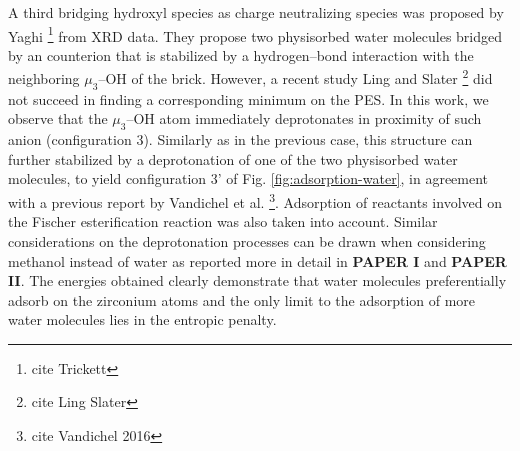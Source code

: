 A third bridging hydroxyl species as charge neutralizing species was proposed by Yaghi \footnote{cite Trickett} from XRD data. They propose two physisorbed water molecules bridged by an  counterion that is stabilized by a hydrogen--bond interaction with the neighboring $\mu_3$--OH of the brick. However, a recent study Ling and Slater \footnote{cite Ling Slater} did not succeed in finding a corresponding minimum on the PES. In this work, we observe that the $\mu_3$--OH atom immediately deprotonates in proximity of such  anion (configuration 3). Similarly as in the previous case, this structure can further stabilized by a deprotonation of one of the two physisorbed water molecules, to yield configuration 3’ of Fig. \ref{fig:adsorption-water}, in agreement with a previous report by Vandichel et al. \footnote{cite Vandichel 2016}. Adsorption of reactants involved on the Fischer esterification reaction was also taken into account. Similar considerations on the deprotonation processes can be drawn when considering methanol instead of water as reported more in detail in \textbf{PAPER I} and \textbf{PAPER II}. The energies obtained clearly demonstrate that water molecules preferentially adsorb on the zirconium atoms and the only limit to the adsorption of more water molecules lies in the entropic penalty. 

